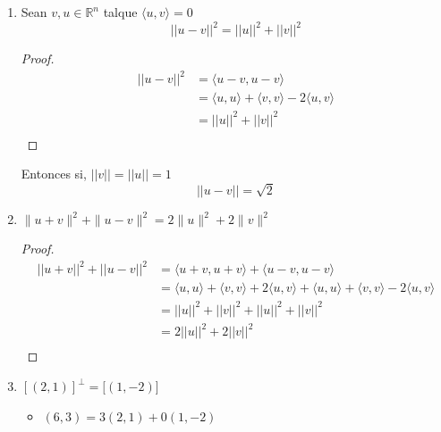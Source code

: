\documentclass[11pt]{article}
\begin{document}
\begin{enumerate}
\begin{proof}
\[\begin{aligned}
      &= (a^2 \cos^2 \theta + b^2 \sin^2 \theta + ab \cos \theta \sin \theta )
                + (a^2 \sin^2 \theta + b^2 \cos^2 \theta - ab \cos \theta \sin \theta)\\
      &= (a \cos \theta + b \sin \theta)^2 + (a \sin \theta - b \cos \theta)^2\\
      &\geq  (a \cos \theta + b \sin \theta)^2 \\
      &\geq  |a \cos \theta + b \sin \theta|^2 \\
    \end{aligned} \]
  \end{proof}
  \item Sean $v , u \in \mathbb{R}^n$ talque $\langle u, v \rangle = 0$
    \[ || u-v ||^2 = ||u||^2 + ||v||^2 \]
    \begin{proof}
      \[ \begin{aligned} 
        ||u - v ||^2 &= \langle u - v, u - v \rangle \\
                     &= \langle u,u\rangle + \langle v,v \rangle- 2\langle u,v\rangle \\
                     &= || u ||^2 + ||v||^2 \\
      \end{aligned}\]
    \end{proof}
    Entonces si, $||v||=||u||= 1$
    \[ ||u-v|| = \sqrt{2} \]
  \item $\|u+v\|^{2}+\|u-v\|^{2}=2\|u\|^{2}+2\|v\|^{2}$
    \begin{proof}
      \[ \begin{aligned}
          ||u+v||^2 + ||u-v||^2 &=\langle u+v,u+v \rangle + \langle u-v,u-v \rangle\\   
           &= \langle u,u \rangle + \langle v,v \rangle + 2 \langle u,v \rangle +
            \langle u,u \rangle + \langle v,v \rangle - 2 \langle u,v \rangle \\
           &= || u ||^2 + ||v||^2 + || u ||^2 + ||v||^2 \\
           &= 2 || u ||^2 + 2 ||v||^2 \\
      \end{aligned} \]    
    \end{proof}  
  \item $[(2,1)]^{\perp} = [(1,-2)$]\\
    \begin{itemize}
    \item $(6,3) = 3 (2,1) + 0 (1,-2)$
    \begin{center}
      \begin{tikzpicture}[scale=0.5]

\end{tikzpicture}
\end{center}
\end{itemize}
\end{enumerate}
\end{document}
